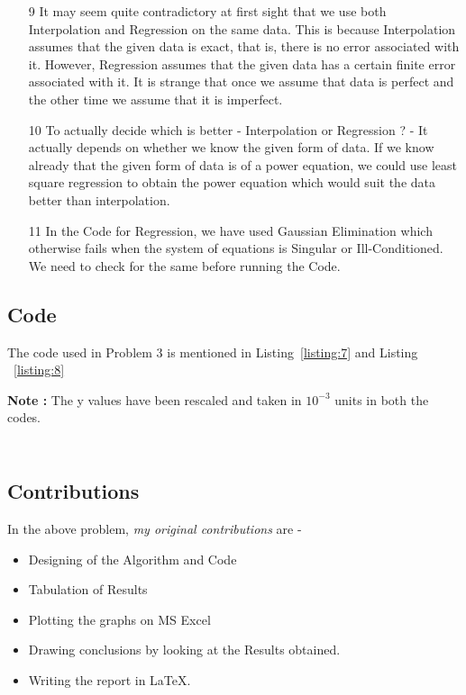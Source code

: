 \documentclass[titlepage, 11pt]{article}
\begin{document}
\begin{itemize}
  \item [9] It may seem quite contradictory at first sight that we use both Interpolation and Regression on the same data. This is because Interpolation assumes that the given data is exact, that is, there is no error associated with it. However, Regression assumes that the given data has a certain finite error associated with it. It is strange that once we assume that data is perfect and the other time we assume that it is imperfect.
  \item [10] To actually decide which is better - Interpolation or Regression ? - It actually depends on whether we know the given form of data. If we know already that the given form of data is of a power equation, we could use least square regression to obtain the power equation which would suit the data better than interpolation. 
  \item [11] In the Code for Regression, we have used Gaussian Elimination which otherwise fails when the system of equations is Singular or Ill-Conditioned. We need to check for the same before running the Code. 
\end{itemize}


\subsection{Code}
The code used in Problem 3 is mentioned in Listing~\ref{listing:7} and Listing ~\ref{listing:8}

\textbf{Note :} The y values have been rescaled and taken in $10^{-3}$ units in both the codes. 

\inputminted[breaklines,
 mathescape,
 linenos,
 numbersep=5pt,
 frame=single,
 numbersep=5pt,
 xleftmargin=0pt]{c}{A5P3I.c}
\label{listing:7}

\inputminted[breaklines,
 mathescape,
 linenos,
 numbersep=5pt,
 frame=single,
 numbersep=5pt,
 xleftmargin=0pt]{c}{A5P3P.c}
\label{listing:8}


\subsection{Contributions}
In the above problem, \textit{my original contributions} are - 
\begin{itemize}
    \item Designing of the Algorithm and Code
    \item Tabulation of Results
    \item Plotting the graphs on MS Excel
    \item Drawing conclusions by looking at the Results obtained.
    \item Writing the report in LaTeX. 
\end{itemize}
\end{document}
